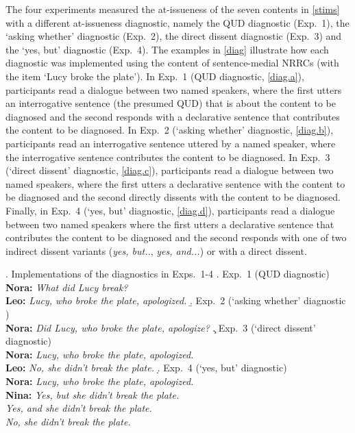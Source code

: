 \documentclass[times,linguex,xcolor]{glossa}
\begin{document}
The four experiments measured the at-issueness of the seven contents in \ref{stims} with a different at-issueness diagnostic, namely the QUD diagnostic (Exp.~1), the `asking whether' diagnostic (Exp.~2), the direct dissent diagnostic (Exp.~3) and the `yes, but' diagnostic (Exp.~4). The examples in \ref{diag} illustrate how each diagnostic was implemented using the content of sentence-medial NRRCs (with the item `Lucy broke the plate'). In Exp.~1 (QUD diagnostic, \ref{diag.a}), participants read a dialogue between two named speakers, where the first utters an interrogative sentence (the presumed QUD) that is about the content to be diagnosed and the second responds with a declarative sentence that contributes the content to be diagnosed. In Exp.~2 (`asking whether' diagnostic, \ref{diag.b}), participants read an interrogative sentence uttered by a named speaker, where the interrogative sentence contributes the content to be diagnosed. In Exp.~3 (`direct dissent' diagnostic, \ref{diag.c}), participants read a dialogue between two named speakers, where the first utters a declarative sentence with the content to be diagnosed and the second directly dissents with the content to be diagnosed. Finally, in Exp.~4 (`yes, but' diagnostic, \ref{diag.d}), participants read a dialogue between two named speakers where the first utters a declarative sentence that contributes the content to be diagnosed and the second responds with one of two indirect dissent variants (\emph{yes, but..}, \emph{yes, and...}) or with a direct dissent.

\ex.\label{diag} Implementations of the diagnostics in Exps.~1-4
\a.\label{diag.a} Exp.~1 (QUD diagnostic)
\\ {\bf Nora:} \emph{What did Lucy break?}
\\ {\bf Leo:} \emph{Lucy, who broke the plate, apologized.}
\b.\label{diag.b} Exp.~2 (`asking whether' diagnostic )
\\ {\bf Nora:} \emph{Did Lucy, who broke the plate, apologize?}
\c.\label{diag.c} Exp.~3 (`direct dissent' diagnostic)
\\ {\bf Nora:} \emph{Lucy, who broke the plate, apologized.}
\\ {\bf Leo:} \emph{No, she didn't break the plate.}
\d.\label{diag.d} Exp.~4 (`yes, but' diagnostic)
\\ {\bf Nora:} \emph{Lucy, who broke the plate, apologized.}
\\ {\bf Nina:} \emph{Yes, but she didn't break the plate.}
\\ \hspace*{1cm} \emph{Yes, and she didn't break the plate.}
\\ \hspace*{1cm} \emph{No, she didn't break the plate.}
\end{document}
